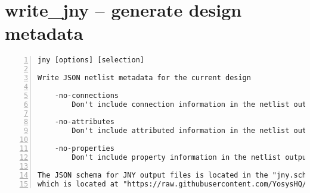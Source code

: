 \section{write\_jny -- generate design metadata}
\label{cmd:write_jny}
\begin{lstlisting}[numbers=left,frame=single]
    jny [options] [selection]

Write JSON netlist metadata for the current design

    -no-connections
        Don't include connection information in the netlist output.

    -no-attributes
        Don't include attributed information in the netlist output.

    -no-properties
        Don't include property information in the netlist output.

The JSON schema for JNY output files is located in the "jny.schema.json" file
which is located at "https://raw.githubusercontent.com/YosysHQ/yosys/master/misc/jny.schema.json"
\end{lstlisting}

